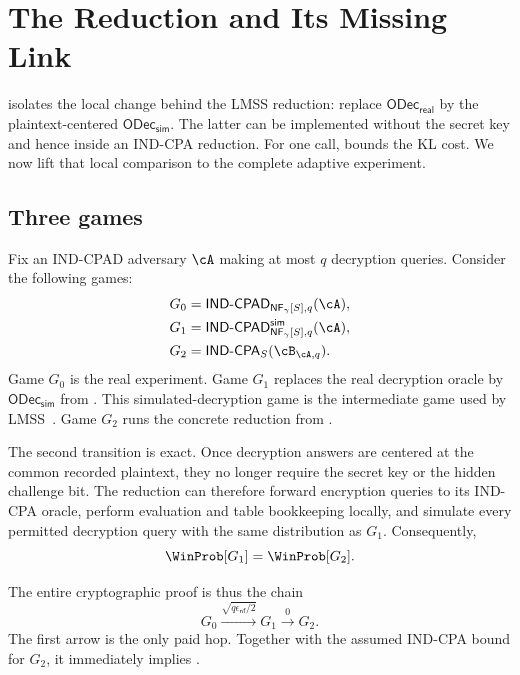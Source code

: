 \section{The Reduction and Its Missing Link}
\label{sec:verified-reduction}

 isolates the local change behind the LMSS
reduction: replace \(\mathsf{ODec}_{\mathsf{real}}\) by the
plaintext-centered \(\mathsf{ODec}_{\mathsf{sim}}\).
The latter can be implemented without the secret key and hence inside an
IND-CPA reduction.
For one call,  bounds the KL cost.
We now lift that local comparison to the complete adaptive experiment.

\subsection{Three games}

Fix an IND-CPAD adversary \(\cA\) making at most \(q\) decryption queries.
Consider the following games:
\begin{align*}
 G_0 &=
   \mathsf{IND\text{-}CPAD}_{\mathsf{NF}_{\gamma}[S],q}(\cA),\\
 G_1 &=
   \mathsf{IND\text{-}CPAD}^{\mathsf{sim}}_
     {\mathsf{NF}_{\gamma}[S],q}(\cA),\\
 G_2 &=
   \mathsf{IND\text{-}CPA}_{S}(\cB_{\cA,q}).
\end{align*}
Game \(G_0\) is the real experiment.
Game \(G_1\) replaces the real decryption oracle by
\(\mathsf{ODec}_{\mathsf{sim}}\) from .
This simulated-decryption game is the intermediate game used by
LMSS~\cite{lmss}.
Game \(G_2\) runs the concrete reduction from
.

The second transition is exact.
Once decryption answers are centered at the common recorded plaintext, they no
longer require the secret key or the hidden challenge bit.
The reduction can therefore forward encryption queries to its IND-CPA oracle,
perform evaluation and table bookkeeping locally, and simulate every permitted
decryption query with the same distribution as \(G_1\).
Consequently,
\[
 \WinProb[G_1]=\WinProb[G_2].
\]

The entire cryptographic proof is thus the chain
\begin{equation}
\label{eq:conceptual-game-chain}
 G_0
 \xrightarrow{\sqrt{q\epsilon_{\mathsf{nf}}/2}}
 G_1
 \xrightarrow{0}
 G_2.
\end{equation}
The first arrow is the only paid hop.
Together with the assumed IND-CPA bound for \(G_2\), it immediately implies
.

